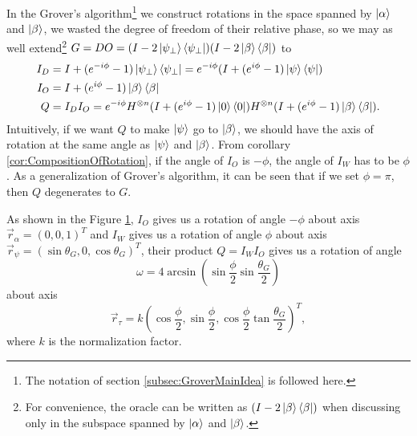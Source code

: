 \documentclass[a4paper,10pt]{book}
\numberwithin{equation}{section}
\begin{document}
In the Grover's algorithm\footnote{The notation of section \ref{subsec:GroverMainIdea} is followed here.} we construct rotations in the space spanned by $\ket{\alpha}$ and $\ket{\beta}$, we wasted the degree of freedom of their relative phase, so we may as well extend\footnote{For convenience, the oracle can be written as $(I-2\ket{\beta}\bra{\beta})$ when discussing only in the subspace spanned by $\ket{\alpha}$ and $\ket{\beta}$.} $G=DO=(I-2\ket{\psi_{\perp}}\bra{\psi_{\perp}})(I-2\ket{\beta}\bra{\beta})$ to
\begin{equation}
    \begin{split}
        I_{D} & = I+(e^{-i\phi}-1)\ket{\psi_{\perp}}\bra{\psi_{\perp}} = e^{-i\phi}(I+(e^{i\phi}-1)\ket{\psi}\bra{\psi})                   \\
        I_{O} & = I+(e^{i\phi}-1)\ket{\beta}\bra{\beta}                                                                                    \\
        Q     & = I_{D}I_{O} = e^{-i\phi}H^{\otimes n}(I+(e^{i\phi}-1)\ket{0}\bra{0})H^{\otimes n}(I+(e^{i\phi}-1)\ket{\beta}\bra{\beta}).
    \end{split}
\end{equation}
Intuitively, if we want $Q$ to make $\ket{\psi}$ go to $\ket{\beta}$, we should have the axis of rotation at the same angle as $\ket{\psi}$ and $\ket{\beta}$. From corollary \ref{cor:CompositionOfRotation}, if the angle of $I_{O}$ is $-\phi$, the angle of $I_{W}$ has to be $\phi$. As a generalization of Grover's algorithm, it can be seen that if we set $\phi=\pi$, then $Q$ degenerates to $G$.
\begin{figure}[h]
    \centering
    \resizebox{0.5\textwidth}{!}{}
    \caption{}
    \label{fig:long}
\end{figure}

As shown in the Figure \ref{fig:long}, $I_{O}$ gives us a rotation of angle $-\phi$ about axis $\vec{r}_{\alpha}=(0,0,1)^{T}$ and $I_{W}$ gives us a rotation of angle $\phi$ about axis $\vec{r}_{\psi}=(\sin\theta_{G},0,\cos\theta_{G})^{T}$, their product $Q=I_{W}I_{O}$ gives us a rotation of angle
\begin{equation}
    \omega=4\arcsin(\sin\frac{\phi}{2}\sin\frac{\theta_{G}}{2})
\end{equation}
about axis
\begin{equation}
    \vec{r}_{\tau}= k(\cos\frac{\phi}{2},\sin\frac{\phi}{2},\cos\frac{\phi}{2}\tan\frac{\theta_{G}}{2})^{T},
\end{equation}
where $k$ is the normalization factor.
\end{document}
